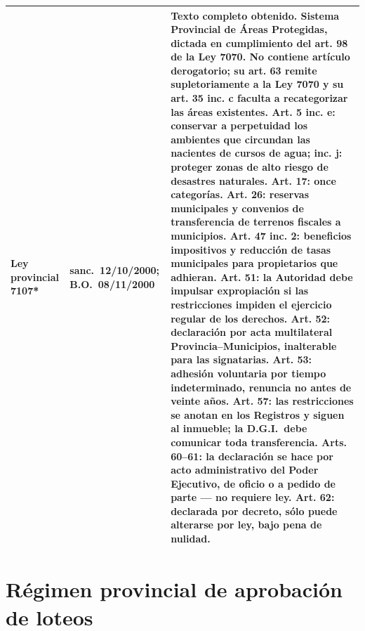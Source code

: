 \begin{longtable}{@{}p{3.2cm}p{1.9cm}p{7.9cm}@{}}
\textbf{Ley provincial 7107*} & sanc.\ 12/10/2000; B.O.\ 08/11/2000 & \textbf{Texto completo obtenido.} Sistema Provincial de Áreas Protegidas, dictada en cumplimiento del art. 98 de la Ley 7070. \textbf{No contiene artículo derogatorio}; su art. 63 remite supletoriamente a la Ley 7070 y su art. 35 inc. c faculta a recategorizar las áreas existentes. Art. 5 inc. e: conservar \textbf{a perpetuidad} los ambientes que circundan las nacientes de cursos de agua; inc. j: proteger zonas de alto riesgo de desastres naturales. Art. 17: once categorías. Art. 26: reservas municipales y convenios de \textbf{transferencia de terrenos fiscales} a municipios. Art. 47 inc. 2: beneficios impositivos y reducción de tasas municipales para propietarios que adhieran. Art. 51: la Autoridad \textbf{debe impulsar expropiación} si las restricciones impiden el ejercicio regular de los derechos. Art. 52: declaración por \textbf{acta multilateral} Provincia--Municipios, inalterable para las signatarias. Art. 53: adhesión voluntaria por tiempo indeterminado, renuncia no antes de veinte años. Art. 57: las restricciones \textbf{se anotan en los Registros} y siguen al inmueble; la D.G.I.\ debe comunicar toda transferencia. Arts. 60--61: la declaración se hace por \textbf{acto administrativo del Poder Ejecutivo}, de oficio o a pedido de parte --- \textbf{no requiere ley}. Art. 62: declarada por decreto, sólo puede alterarse \textbf{por ley}, bajo pena de nulidad.\\
\bottomrule
\end{longtable}

\section*{Régimen provincial de aprobación de loteos}

